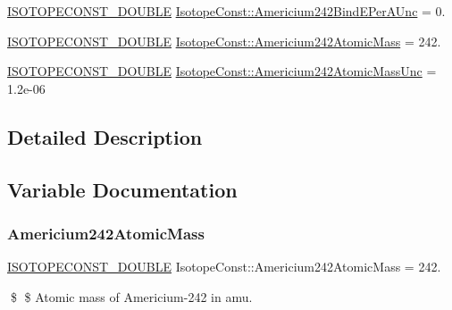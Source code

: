 \begin{DoxyCompactItemize}
\mbox{\hyperlink{group___isotope_const-_macros_ga8f45a7272ce02c0b4c65c44636ed719a}{I\+S\+O\+T\+O\+P\+E\+C\+O\+N\+S\+T\+\_\+\+D\+O\+U\+B\+LE}} \mbox{\hyperlink{group___isotope_const-_americium-_am242_ga97defc4a08db20fcf5eed1faf39cc2ea}{Isotope\+Const\+::\+Americium242\+Bind\+E\+Per\+A\+Unc}} = 0.
\item 
\mbox{\hyperlink{group___isotope_const-_macros_ga8f45a7272ce02c0b4c65c44636ed719a}{I\+S\+O\+T\+O\+P\+E\+C\+O\+N\+S\+T\+\_\+\+D\+O\+U\+B\+LE}} \mbox{\hyperlink{group___isotope_const-_americium-_am242_ga8399fbfc4ffc57c1a924da7cdfa68297}{Isotope\+Const\+::\+Americium242\+Atomic\+Mass}} = 242.
\item 
\mbox{\hyperlink{group___isotope_const-_macros_ga8f45a7272ce02c0b4c65c44636ed719a}{I\+S\+O\+T\+O\+P\+E\+C\+O\+N\+S\+T\+\_\+\+D\+O\+U\+B\+LE}} \mbox{\hyperlink{group___isotope_const-_americium-_am242_gac2388fda189107f412230f606a767021}{Isotope\+Const\+::\+Americium242\+Atomic\+Mass\+Unc}} = 1.\+2e-\/06
\end{DoxyCompactItemize}


\subsection{Detailed Description}


\subsection{Variable Documentation}
\mbox{\label{group___isotope_const-_americium-_am242_ga8399fbfc4ffc57c1a924da7cdfa68297}} 
\subsubsection{\texorpdfstring{Americium242\+Atomic\+Mass}{Americium242AtomicMass}}
{\footnotesize\ttfamily \mbox{\hyperlink{group___isotope_const-_macros_ga8f45a7272ce02c0b4c65c44636ed719a}{I\+S\+O\+T\+O\+P\+E\+C\+O\+N\+S\+T\+\_\+\+D\+O\+U\+B\+LE}} Isotope\+Const\+::\+Americium242\+Atomic\+Mass = 242.}

\$ \$ Atomic mass of Americium-\/242 in amu. \mbox{\label{group___isotope_const-_americium-_am242_gac2388fda189107f412230f606a767021}} 
